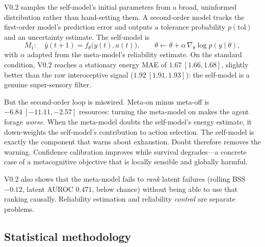 \documentclass[11pt,a4paper]{article}
\begin{document}
V0.2 samples the self-model's initial parameters from a broad, uninformed distribution rather than hand-setting them. A second-order model tracks the first-order model's prediction error and outputs a tolerance probability $p(\mathrm{tol})$ and an uncertainty estimate. The self-model is
\begin{equation}
M_1:\quad \hat{y}(t+1) = f_\theta\bigl(y(t),a(t)\bigr),
\qquad
\theta \leftarrow \theta + \alpha\,\nabla_\theta \log p(y\mid\theta),
\end{equation}
with $\alpha$ adapted from the meta-model's reliability estimate. On the standard condition, V0.2 reaches a stationary energy MAE of $\mathbf{1.67\ [1.66,1.68]}$, slightly better than the raw interoceptive signal ($\mathbf{1.92\ [1.91,1.93]}$): the self-model is a genuine super-sensory filter.

But the second-order loop is miswired. Meta-on minus meta-off is $\mathbf{-6.84\ [-11.11,-2.57]}$ resources: turning the meta-model on makes the agent forage \emph{worse}. When the meta-model doubts the self-model's energy estimate, it down-weights the self-model's contribution to action selection. The self-model is exactly the component that warns about exhaustion. Doubt therefore removes the warning. Confidence calibration improves while survival degrades---a concrete case of a metacognitive objective that is locally sensible and globally harmful.

V0.2 also shows that the meta-model fails to \emph{rank} latent failures (rolling BSS $-0.12$, latent AUROC $0.471$, below chance) without being able to use that ranking causally. Reliability estimation and reliability \emph{control} are separate problems.

\subsection{Statistical methodology}
\end{document}
